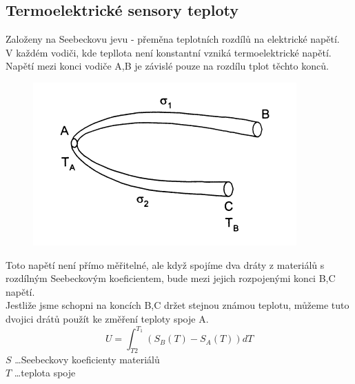\subsection*{Termoelektrické sensory teploty}
Založeny na Seebeckovu jevu - přeměna teplotních rozdílů na elektrické napětí.\\
V každém vodiči, kde tepllota není konstantní vzniká termoelektrické napětí. Napětí mezi konci vodiče A,B je závislé pouze na rozdílu tplot těchto konců.\\
\begin{figure}[H]
    \includegraphics*[scale = 1]{img/termoclanek.png}
\end{figure}
Toto napětí není přímo měřitelné, ale když spojíme dva dráty z materiálů s rozdílným Seebeckovým koeficientem, bude mezi jejich rozpojenými konci B,C napětí.\\
Jestliže jsme schopni na koncích B,C držet stejnou známou teplotu, můžeme tuto dvojici drátů použít ke změření teploty spoje A.\\
\begin{equation}
    U = \int^{T_{1}}_{T{2}}(S_B(T)-S_A(T))dT
\end{equation}
$S$ \dots Seebeckovy koeficienty materiálů\\
$T$ \dots teplota spoje\\

